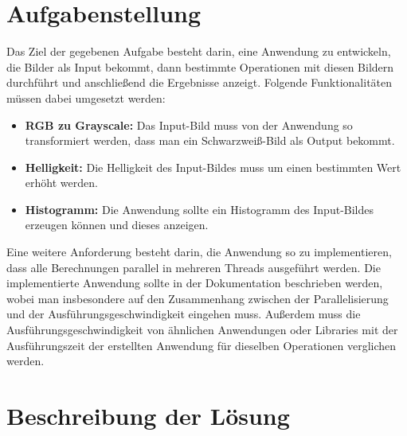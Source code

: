 \documentclass[11pt]{amsart}
\begin{document}
\newpage

\tableofcontents
\newpage


























\section{Aufgabenstellung}
Das Ziel der gegebenen Aufgabe besteht darin, eine Anwendung zu entwickeln, die Bilder als Input bekommt, dann bestimmte Operationen mit diesen Bildern durchführt und anschließend die Ergebnisse anzeigt. Folgende Funktionalitäten müssen dabei umgesetzt werden:
\begin{itemize}
\item \textbf{RGB zu Grayscale:} Das Input-Bild muss von der Anwendung so transformiert werden, dass man ein Schwarzweiß-Bild als Output bekommt.
\item \textbf{Helligkeit:} Die Helligkeit des Input-Bildes muss um einen bestimmten Wert erhöht werden.
\item \textbf{Histogramm:} Die Anwendung sollte ein Histogramm des Input-Bildes erzeugen können und dieses anzeigen.
\end{itemize}

Eine weitere Anforderung besteht darin, die Anwendung so zu implementieren, dass alle Berechnungen parallel in mehreren Threads ausgeführt werden. Die implementierte Anwendung sollte in der Dokumentation beschrieben werden, wobei man insbesondere auf den Zusammenhang zwischen der Parallelisierung und der Ausführungsgeschwindigkeit eingehen muss. Außerdem muss die Ausführungsgeschwindigkeit von ähnlichen Anwendungen oder Libraries mit der Ausführungszeit der erstellten Anwendung für dieselben Operationen verglichen werden.



\newpage
\section{Beschreibung der Lösung}
\end{document}
